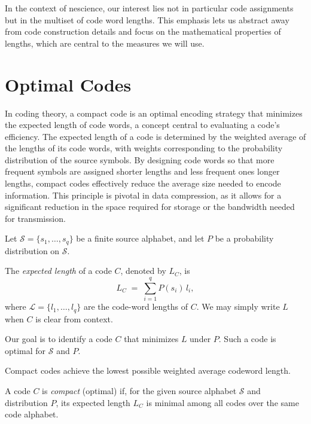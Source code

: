 In the context of nescience, our interest lies not in particular code assignments but in the multiset of code word lengths. This emphasis lets us abstract away from code construction details and focus on the mathematical properties of lengths, which are central to the measures we will use.

%
%

\section{Optimal Codes}
\label{sec:Optimal-Codes}

In coding theory, a compact code is an optimal encoding strategy that minimizes the expected length of code words, a concept central to evaluating a code's efficiency. The expected length of a code is determined by the weighted average of the lengths of its code words, with weights corresponding to the probability distribution of the source symbols. By designing code words so that more frequent symbols are assigned shorter lengths and less frequent ones longer lengths, compact codes effectively reduce the average size needed to encode information. This principle is pivotal in data compression, as it allows for a significant reduction in the space required for storage or the bandwidth needed for transmission.

Let $\mathcal{S}=\{ s_{1},\ldots,s_{q}\}$ be a finite source alphabet, and let $P$ be a probability distribution on $\mathcal{S}$.

\begin{definition}
The \emph{expected length} of a code $C$, denoted by $L_{C}$, is
\[
L_{C} \;=\; \sum_{i=1}^{q} P(s_{i})\,l_{i},
\]
where $\mathcal{L} = \{ l_{1},\ldots,l_{q}\}$ are the code-word lengths of $C$. We may simply write $L$ when $C$ is clear from context.
\end{definition}

Our goal is to identify a code $C$ that minimizes $L$ under $P$. Such a code is optimal for $\mathcal{S}$ and $P$.

Compact codes achieve the lowest possible weighted average codeword length.

\begin{definition}
A code $C$ is \emph{compact} (optimal) if, for the given source alphabet $\mathcal{S}$ and distribution $P$, its expected length $L_{C}$ is minimal among all codes over the same code alphabet.
\end{definition}

